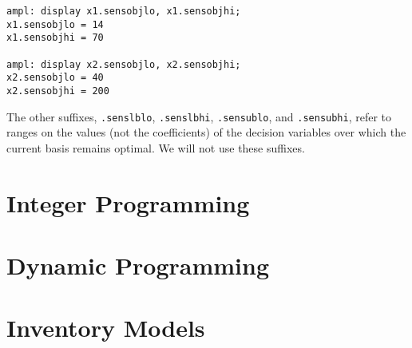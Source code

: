 \begin{Verbatim}[samepage=true]
ampl: display x1.sensobjlo, x1.sensobjhi;
x1.sensobjlo = 14
x1.sensobjhi = 70

ampl: display x2.sensobjlo, x2.sensobjhi;
x2.sensobjlo = 40
x2.sensobjhi = 200
\end{Verbatim}

The other suffixes, \texttt{.senslblo}, \texttt{.senslbhi},
\texttt{.sensublo}, and \texttt{.sensubhi}, refer to ranges on the
values (not the coefficients) of the decision variables over which the
current basis remains optimal. We will not use these suffixes.

\section{Integer Programming}

\section{Dynamic Programming}

\section{Inventory Models}

